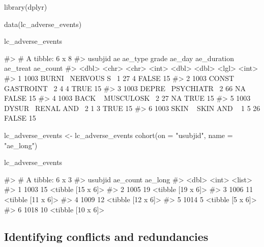\begin{Schunk}
\begin{Sinput}
library(dplyr)

data(lc_adverse_events)

lc_adverse_events %>% head()
\end{Sinput}
\begin{Soutput}
#> # A tibble: 6 x 8
#>   usubjid ae     ae_type    grade ae_day ae_duration ae_treat ae_count
#>     <dbl> <chr>  <chr>      <int>  <dbl>       <dbl> <lgl>       <int>
#> 1    1003 BURNI~ NERVOUS S~     1     27           4 FALSE          15
#> 2    1003 CONST~ GASTROINT~     2      4           4 TRUE           15
#> 3    1003 DEPRE~ PSYCHIATR~     2     66          NA FALSE          15
#> 4    1003 BACK ~ MUSCULOSK~     2     27          NA TRUE           15
#> 5    1003 DYSUR~ RENAL AND~     2      1           3 TRUE           15
#> 6    1003 SKIN ~ SKIN AND ~     1      5          26 FALSE          15
\end{Soutput}
\begin{Sinput}
lc_adverse_events <- lc_adverse_events %>%
  cohort(on = "usubjid", name = "ae_long")

lc_adverse_events %>% head()
\end{Sinput}
\begin{Soutput}
#> # A tibble: 6 x 3
#>   usubjid ae_count ae_long          
#>     <dbl>    <int> <list>           
#> 1    1003       15 <tibble [15 x 6]>
#> 2    1005       19 <tibble [19 x 6]>
#> 3    1006       11 <tibble [11 x 6]>
#> 4    1009       12 <tibble [12 x 6]>
#> 5    1014        5 <tibble [5 x 6]> 
#> 6    1018       10 <tibble [10 x 6]>
\end{Soutput}
\end{Schunk}

\hypertarget{identifying-conflicts-and-redundancies}{%
\subsection{Identifying conflicts and
redundancies}\label{identifying-conflicts-and-redundancies}}


